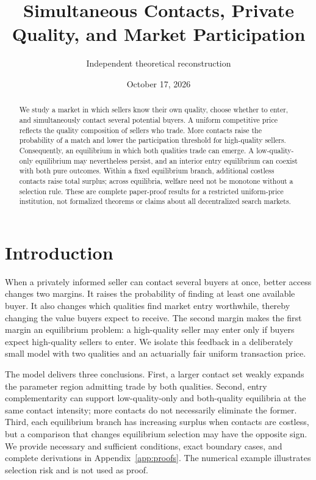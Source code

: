 \documentclass[11pt]{article}
\title{Simultaneous Contacts, Private Quality, and Market Participation}
\author{Independent theoretical reconstruction}
\date{October 17, 2026}
\begin{document}
\maketitle

\begin{abstract}
We study a market in which sellers know their own quality, choose whether to enter, and simultaneously contact several potential buyers. A uniform competitive price reflects the quality composition of sellers who trade. More contacts raise the probability of a match and lower the participation threshold for high-quality sellers. Consequently, an equilibrium in which both qualities trade can emerge. A low-quality-only equilibrium may nevertheless persist, and an interior entry equilibrium can coexist with both pure outcomes. Within a fixed equilibrium branch, additional costless contacts raise total surplus; across equilibria, welfare need not be monotone without a selection rule. These are complete paper-proof results for a restricted uniform-price institution, not formalized theorems or claims about all decentralized search markets.
\end{abstract}

\section{Introduction}

When a privately informed seller can contact several buyers at once, better access changes two margins. It raises the probability of finding at least one available buyer. It also changes which qualities find market entry worthwhile, thereby changing the value buyers expect to receive. The second margin makes the first margin an equilibrium problem: a high-quality seller may enter only if buyers expect high-quality sellers to enter. We isolate this feedback in a deliberately small model with two qualities and an actuarially fair uniform transaction price.

The model delivers three conclusions. First, a larger contact set weakly expands the parameter region admitting trade by both qualities. Second, entry complementarity can support low-quality-only and both-quality equilibria at the same contact intensity; more contacts do not necessarily eliminate the former. Third, each equilibrium branch has increasing surplus when contacts are costless, but a comparison that changes equilibrium selection may have the opposite sign. We provide necessary and sufficient conditions, exact boundary cases, and complete derivations in Appendix~\ref{app:proofs}. The numerical example illustrates selection risk and is not used as proof.
\end{document}
